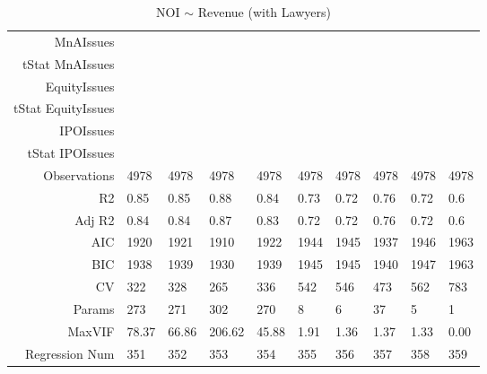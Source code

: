 \begin{table}[ht]
\begin{tabular}{rlllllllll}
  MnAIssues &  &  &  &  &  &  &  &  &  \\ 
  tStat MnAIssues &  &  &  &  &  &  &  &  &  \\ 
  EquityIssues &  &  &  &  &  &  &  &  &  \\ 
  tStat EquityIssues &  &  &  &  &  &  &  &  &  \\ 
  IPOIssues &  &  &  &  &  &  &  &  &  \\ 
  tStat IPOIssues &  &  &  &  &  &  &  &  &  \\ 
  Observations & 4978 & 4978 & 4978 & 4978 & 4978 & 4978 & 4978 & 4978 & 4978 \\ 
  R2 & 0.85 & 0.85 & 0.88 & 0.84 & 0.73 & 0.72 & 0.76 & 0.72 & 0.6 \\ 
  Adj R2 & 0.84 & 0.84 & 0.87 & 0.83 & 0.72 & 0.72 & 0.76 & 0.72 & 0.6 \\ 
  AIC & 1920 & 1921 & 1910 & 1922 & 1944 & 1945 & 1937 & 1946 & 1963 \\ 
  BIC & 1938 & 1939 & 1930 & 1939 & 1945 & 1945 & 1940 & 1947 & 1963 \\ 
  CV & 322 & 328 & 265 & 336 & 542 & 546 & 473 & 562 & 783 \\ 
  Params & 273 & 271 & 302 & 270 & 8 & 6 & 37 & 5 & 1 \\ 
  MaxVIF & 78.37 & 66.86 & 206.62 & 45.88 & 1.91 & 1.36 & 1.37 & 1.33 & 0.00 \\ 
  Regression Num & 351 & 352 & 353 & 354 & 355 & 356 & 357 & 358 & 359 \\ 
   \hline
\end{tabular}
\caption{NOI $\sim$ Revenue (with Lawyers)} 
\end{table}

